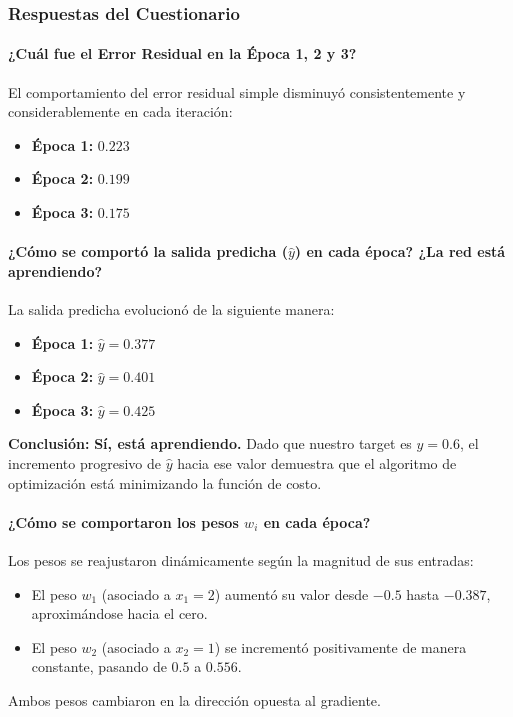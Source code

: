 \documentclass[12pt]{article}
\begin{document}
\subsubsection*{Respuestas del Cuestionario}

\paragraph{¿Cuál fue el Error Residual en la Época 1, 2 y 3?}
El comportamiento del error residual simple disminuyó consistentemente y considerablemente en cada iteración:
\begin{itemize}
    \item \textbf{Época 1:} $0.223$
    \item \textbf{Época 2:} $0.199$
    \item \textbf{Época 3:} $0.175$
\end{itemize}

\paragraph{¿Cómo se comportó la salida predicha ($\hat{y}$) en cada época? ¿La red está aprendiendo?}
La salida predicha evolucionó de la siguiente manera:
\begin{itemize}
    \item \textbf{Época 1:} $\hat{y} = 0.377$
    \item \textbf{Época 2:} $\hat{y} = 0.401$
    \item \textbf{Época 3:} $\hat{y} = 0.425$
\end{itemize}
\textbf{Conclusión:} \textbf{Sí, está aprendiendo.} Dado que nuestro target es $y = 0.6$, el incremento progresivo de $\hat{y}$ hacia ese valor demuestra que el algoritmo de optimización está minimizando la función de costo.

\paragraph{¿Cómo se comportaron los pesos $w_i$ en cada época?}
Los pesos se reajustaron dinámicamente según la magnitud de sus entradas:
\begin{itemize}
    \item El peso \textbf{$w_1$} (asociado a $x_1 = 2$) aumentó su valor desde $-0.5$ hasta $-0.387$, aproximándose hacia el cero.
    \item El peso \textbf{$w_2$} (asociado a $x_2 = 1$) se incrementó positivamente de manera constante, pasando de $0.5$ a $0.556$.
\end{itemize}
Ambos pesos cambiaron en la dirección opuesta al gradiente.
\end{document}
